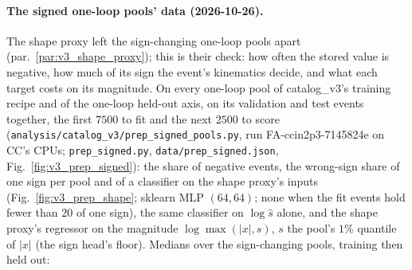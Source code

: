 \documentclass[11pt]{article}
\newcommand{\abs}[1]{\left\lvert #1 \right\rvert}
\newcommand{\code}[1]{\texttt{#1}}
\begin{document}
\paragraph{The signed one-loop pools' data (2026-10-26).}\label{par:v3_prep_signed} The shape proxy left the
sign-changing one-loop pools apart (par.~\ref{par:v3_shape_proxy}); this is their check: how often the stored value is
negative, how much of its sign the event's kinematics decide, and what each target costs on its magnitude. On every
one-loop pool of catalog\_v3's training recipe and of the one-loop held-out axis, on its validation and test events
together, the first $7500$ to fit and the next $2500$ to score (\code{analysis/catalog\_v3/prep\_signed\_pools.py}, run
FA-ccin2p3-7145824e on CC's CPUs; \code{prep\_signed.py}, \code{data/prep\_signed.json}, Fig.~\ref{fig:v3_prep_signed}):
the share of negative events, the wrong-sign share of one sign per pool and of a classifier on the shape proxy's inputs
(Fig.~\ref{fig:v3_prep_shape}; sklearn MLP $(64,64)$; none when the fit events hold fewer than $20$ of one sign), the same classifier on $\log\hat s$
alone, and the shape proxy's regressor on the magnitude $\log\max(\abs x,s)$, $s$ the pool's $1\%$ quantile of $\abs x$
(the sign head's floor). Medians over the sign-changing pools, training then held out:
\end{document}
